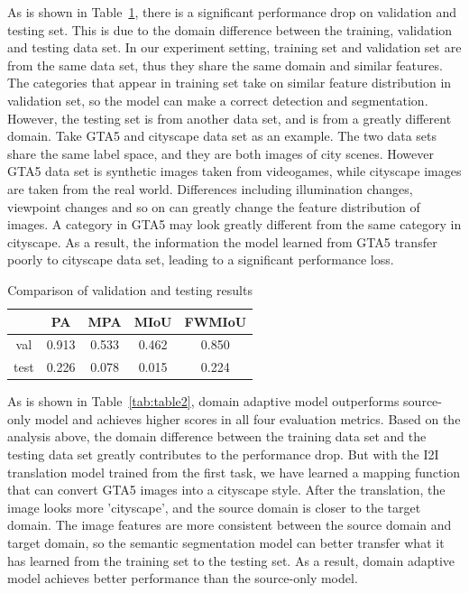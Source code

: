 As is shown in Table~\ref{tab:table1}, there is a significant performance drop on validation and testing set. This is due to the domain difference between the training, validation and testing data set. In our experiment setting, training set and validation set are from the same data set, thus they share the same domain and similar features. The categories that appear in training set take on similar feature distribution in validation set, so the model can make a correct detection and segmentation. However, the testing set is from another data set, and is from a greatly different domain. Take GTA5 and cityscape data set as an example. The two data sets share the same label space, and they are both images of city scenes. However GTA5 data set is synthetic images taken from videogames, while cityscape images are taken from the real world. Differences including illumination changes, viewpoint changes and so on can greatly change the feature distribution of images. A category in GTA5 may look greatly different from the same category in cityscape. As a result, the information the model learned from GTA5 transfer poorly to cityscape data set, leading to a significant performance loss.    
\begin{table}[!htb]
    \centering
    \begin{tabular}{c|c|c|c|c}
    \hline      &  \textbf{PA} & \textbf{MPA} & \textbf{MIoU} & \textbf{FWMIoU} \\
    \hline     val & 0.913 & 0.533 & 0.462 & 0.850\\
    \hline     test & 0.226 & 0.078 & 0.015 & 0.224\\
    \hline
    \end{tabular}
    \caption{Comparison of validation and testing results}
    \label{tab:table1}
\end{table}

As is shown in Table~\ref{tab:table2}, domain adaptive model outperforms source-only model and achieves higher scores in all four evaluation metrics. Based on the analysis above, the domain difference between the training data set and the testing data set greatly contributes to the performance drop. But with the I2I translation model trained from the first task, we have learned a mapping function that can convert GTA5 images into a cityscape style. After the translation, the image looks more 'cityscape', and the source domain is closer to the target domain. The image features are more consistent between the source domain and target domain, so the semantic segmentation model can better transfer what it has learned from the training set to the testing set. As a result, domain adaptive model achieves better performance than the source-only model.

